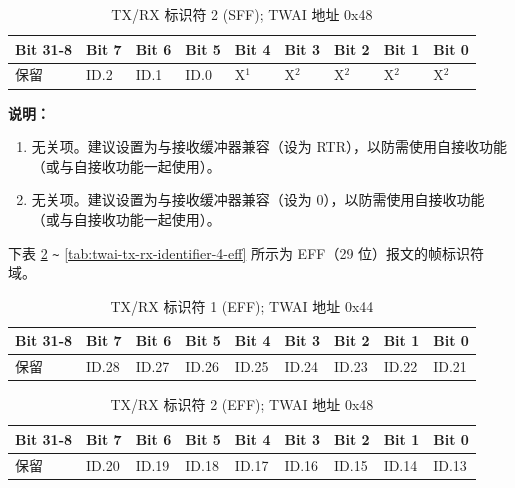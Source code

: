 \documentclass[main\_\_CN.tex]{subfiles}
\begin{document}
\begin{longtable}[c]{|p{1.4cm}|p{1.4cm}|p{1.4cm}|p{1.4cm}|p{1.4cm}|p{1.4cm}|p{1.4cm}|p{1.4cm}|p{1.4cm}|}
    \caption{TX/RX 标识符 2 (SFF); TWAI 地址 0x48}
    \label{tab:twai-tx-rx-identifier-2-sff}\\
    \hline
       \rowcolor{lightgray}
    \textbf{Bit 31-8} & \textbf{Bit 7} & \textbf{Bit 6} & \textbf{Bit 5} & \textbf{Bit 4} & \textbf{Bit 3} & \textbf{Bit 2} & \textbf{Bit 1} & \textbf{Bit 0}\\\hline
    保留 & ID.2 & ID.1 & ID.0 & X$^1$ & X$^2$ & X$^2$ & X$^2$ & X$^2$\\
    \hline
\end{longtable}
\vspace{-1.5em}
{\bfseries 说明：}\\
\begin{enumerate}
    \item 无关项。建议设置为与接收缓冲器兼容（设为 RTR），以防需使用自接收功能（或与自接收功能一起使用）。
    \item 无关项。建议设置为与接收缓冲器兼容（设为 0），以防需使用自接收功能（或与自接收功能一起使用）。
\end{enumerate}

\clearpage
下表 \ref{tab:twai-tx-rx-identifier-1-eff} \verb+~+ \ref{tab:twai-tx-rx-identifier-4-eff} 所示为 EFF（29 位）报文的帧标识符域。

\begin{longtable}[c]{|p{1.4cm}|p{1.4cm}|p{1.4cm}|p{1.4cm}|p{1.4cm}|p{1.4cm}|p{1.4cm}|p{1.4cm}|p{1.4cm}|}
    \caption{TX/RX 标识符 1 (EFF); TWAI 地址 0x44}
    \label{tab:twai-tx-rx-identifier-1-eff}\\
    \hline
       \rowcolor{lightgray}
    \textbf{Bit 31-8} & \textbf{Bit 7} & \textbf{Bit 6} & \textbf{Bit 5} & \textbf{Bit 4} & \textbf{Bit 3} & \textbf{Bit 2} & \textbf{Bit 1} & \textbf{Bit 0}\\\hline
    保留 & ID.28 & ID.27 & ID.26 & ID.25 & ID.24 & ID.23 & ID.22 & ID.21\\
    \hline
\end{longtable}

\begin{longtable}[c]{|p{1.4cm}|p{1.4cm}|p{1.4cm}|p{1.4cm}|p{1.4cm}|p{1.4cm}|p{1.4cm}|p{1.4cm}|p{1.4cm}|}
    \caption{TX/RX 标识符 2 (EFF); TWAI 地址 0x48}
    \label{tab:twai-tx-rx-identifier-2-eff}\\
    \hline
       \rowcolor{lightgray}
    \textbf{Bit 31-8} & \textbf{Bit 7} & \textbf{Bit 6} & \textbf{Bit 5} & \textbf{Bit 4} & \textbf{Bit 3} & \textbf{Bit 2} & \textbf{Bit 1} & \textbf{Bit 0}\\\hline
    保留 & ID.20 & ID.19 & ID.18 & ID.17 & ID.16 & ID.15 & ID.14 & ID.13\\
    \hline
\end{longtable}
\end{document}

